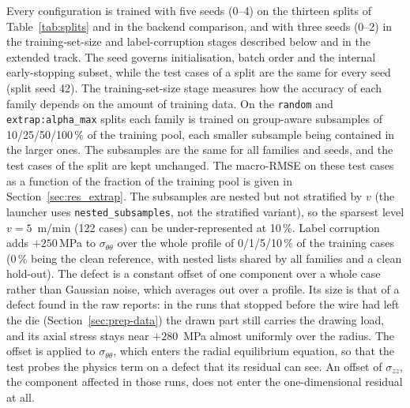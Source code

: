 \documentclass[subscriptcorrection,upint,varvw,barcolor=Goldenrod3,mathalfa=cal=euler,balance,hyphenate,french,pdf-a]{asmejour} %
\begin{document}
Every configuration is trained with five seeds (0--4) on the thirteen splits of
Table~\ref{tab:splits} and in the backend comparison, and with three seeds (0--2)
in the training-set-size and label-corruption stages described below and in the
extended track.
The seed governs initialisation, batch order and the internal early-stopping subset, %
while the test cases of a split are the same for every seed (split seed 42).
The training-set-size stage measures how the accuracy of each family depends on
the amount of training data. On the \texttt{random} and
\texttt{extrap:alpha\_max} splits each family is trained on group-aware
subsamples of 10/25/50/100\,\% of the training pool, each smaller subsample
being contained in the larger ones. The subsamples are the same for all
families and seeds, and the test cases of the split are kept unchanged. The
macro-RMSE on these test cases as a function of the fraction of the training
pool is given in Section~\ref{sec:res_extrap}.
The subsamples are nested but not stratified by $v$ (the launcher uses
\texttt{nested\_subsamples}, not the stratified variant), so the sparsest level
$v = 5$~m/min (122 cases) can be under-represented at 10\,\%.
Label corruption adds $+250$\,MPa to $\sigma_{\theta\theta}$ over the whole profile of 0/1/5/10\,\% of
the training cases (0\,\% being the clean reference, with nested lists shared by all
families and a clean hold-out). The defect is a constant offset of one component over a whole case rather than Gaussian noise, which averages out over a profile. Its size is that of a defect found in the raw reports: in the runs that stopped before the wire had left the die (Section~\ref{sec:prep-data}) the drawn part still carries the drawing load, and its axial stress stays near $+280$~MPa almost uniformly over the radius. The offset is applied to $\sigma_{\theta\theta}$, which enters the radial equilibrium equation, so that the test probes the physics term on a defect that its residual can see. An offset of $\sigma_{zz}$, the component affected in those runs, does not enter the one-dimensional residual at all.
\end{document}
